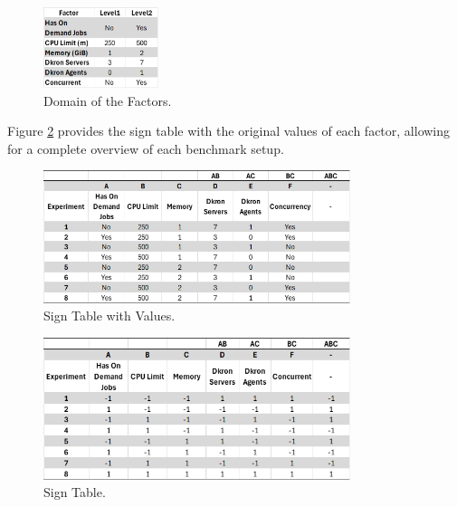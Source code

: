 \documentclass[runningheads]{llncs}
\begin{document}
\begin{figure}[H]
    \centering
    \includegraphics[width=0.3\textwidth]{media/FactorAnalysis_DomainFactors.png}
    \caption{Domain of the Factors.}
    \label{fig:factorsdomain}
\end{figure}

Figure \ref{fig:fulloriginalfactors} provides the sign table with the original values of each factor, allowing for a complete overview of each benchmark setup.

\begin{figure}[H]
    \centering
    \includegraphics[width=0.8\textwidth]{media/FullFactorTable_OriginalFactors.png}
    \caption{Sign Table with Values.}
    \label{fig:fulloriginalfactors}
\end{figure}

\begin{figure}[H]
    \centering
    \includegraphics[width=0.8\textwidth]{media/FullFactorTable_onesminusones.png}
    \caption{Sign Table.}
    \label{fig:fullconvertedoriginalfactors}
\end{figure}
\end{document}
